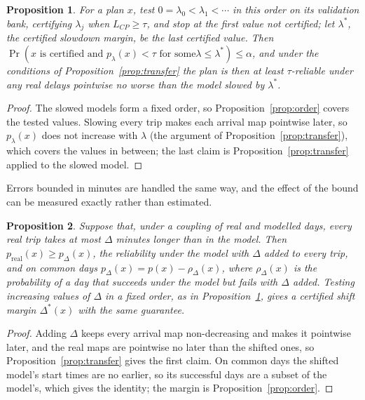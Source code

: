 \documentclass[11pt,a4paper]{article}
\newtheorem{proposition}{Proposition}
\theoremstyle{remark}
\begin{document}
\begin{proposition}\label{prop:margin}
For a plan $x$, test $0=\lambda_0<\lambda_1<\cdots$ in this order on its validation
bank, certifying $\lambda_j$ when $L_{CP}\ge\tau$, and stop at the first value not
certified; let $\lambda^*$, the \emph{certified slowdown margin}, be the last certified
value. Then $\Pr(x\text{ is certified and }p_\lambda(x)<\tau\text{ for some
}\lambda\le\lambda^*)\le\alpha$, and under the conditions of
Proposition~\ref{prop:transfer} the plan is then at least $\tau$-reliable under any
real delays pointwise no worse than the model slowed by $\lambda^*$.
\end{proposition}

\begin{proof}
The slowed models form a fixed order, so Proposition~\ref{prop:order} covers the tested
values. Slowing every trip makes each arrival map pointwise later, so $p_\lambda(x)$
does not increase with $\lambda$ (the argument of Proposition~\ref{prop:transfer}),
which covers the values in between; the last claim is Proposition~\ref{prop:transfer}
applied to the slowed model.
\end{proof}

Errors bounded in minutes are handled the same way, and the effect of the bound can
be measured exactly rather than estimated.

\begin{proposition}\label{prop:shift}
Suppose that, under a coupling of real and modelled days, every real trip takes at most
$\Delta$ minutes longer than in the model. Then $p_{\mathrm{real}}(x)\ge p_\Delta(x)$, the
reliability under the model with $\Delta$ added to every trip, and on common days
$p_\Delta(x)=p(x)-\rho_\Delta(x)$, where $\rho_\Delta(x)$ is the probability of a day that
succeeds under the model but fails with $\Delta$ added. Testing increasing values of $\Delta$
in a fixed order, as in Proposition~\ref{prop:margin}, gives a certified shift margin
$\Delta^*(x)$ with the same guarantee.
\end{proposition}

\begin{proof}
Adding $\Delta$ keeps every arrival map non-decreasing and makes it pointwise later, and the
real maps are pointwise no later than the shifted ones, so Proposition~\ref{prop:transfer}
gives the first claim. On common days the shifted model's start times are no earlier, so
its successful days are a subset of the model's, which gives the identity; the margin is
Proposition~\ref{prop:order}.
\end{proof}
\end{document}
